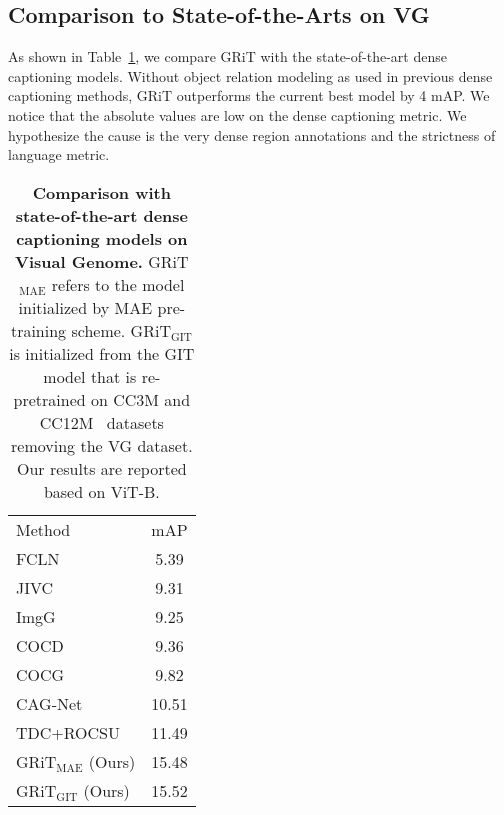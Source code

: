 \documentclass[10pt,twocolumn,letterpaper]{article}
\begin{document}
\subsection{Comparison to State-of-the-Arts on VG}
As shown in Table~\ref{tab:sota_densecap}, we compare GRiT with the state-of-the-art dense captioning models. Without object relation modeling as used in previous dense captioning methods, GRiT outperforms the current best model by 4 mAP. We notice that the absolute values are low on the dense captioning metric. We hypothesize the cause is the very dense region annotations and the strictness of language metric.

\begin{table}[t]
\vspace{-3mm}
	\begin{center}	
		\setlength{\tabcolsep}{10pt}
		\begin{tabular}{l|c}
			\rowcolor{mygray}
			Method&mAP\\ 
			\shline
            FCLN~\cite{johnson2016densecap}&5.39\\
            JIVC~\cite{yang2017dense}&9.31\\
            ImgG~\cite{li2019learning}&9.25\\
            COCD~\cite{li2019learning}&9.36\\
            COCG~\cite{li2019learning}&9.82\\
            CAG-Net~\cite{yin2019context}&10.51\\
            TDC+ROCSU~\cite{shao2022region}&11.49\\
            \hline
            GRiT$_\text{MAE}$ (Ours)&15.48\\
			GRiT$_\text{GIT}$ (Ours)&15.52\\
			\hline
		\end{tabular}
	\end{center}
    \vspace{-4mm}
	\caption{\textbf{Comparison with state-of-the-art dense captioning models on Visual Genome.} GRiT$_\text{MAE}$ refers to the model initialized by MAE pre-training scheme. GRiT$_\text{GIT}$ is initialized from the GIT model that is re-pretrained on CC3M and CC12M~\cite{sharma2018conceptual} datasets removing the VG dataset. Our results are reported based on ViT-B.}
	\vspace{-4mm}
	\label{tab:sota_densecap}
\end{table}
\end{document}
